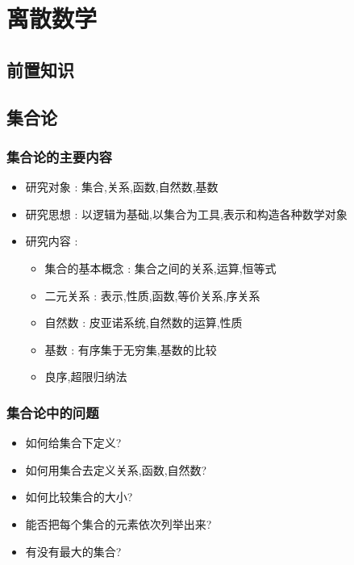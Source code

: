 \section{离散数学}{

\subsection{前置知识}

\subsection{集合论}{

\subsubsection{集合论的主要内容}{
  \begin{itemize}
    \item 研究对象 : 集合,关系,函数,自然数,基数
    \item 研究思想 : 以逻辑为基础,以集合为工具,表示和构造各种数学对象
    \item 研究内容 : \begin{itemize}
            \item 集合的基本概念 : 集合之间的关系,运算,恒等式
            \item 二元关系 : 表示,性质,函数,等价关系,序关系
            \item 自然数 : 皮亚诺系统,自然数的运算,性质
            \item 基数 : 有序集于无穷集,基数的比较
            \item 良序,超限归纳法
          \end{itemize}
  \end{itemize}
}%

\subsubsection{集合论中的问题}{
  \begin{itemize}
    \item 如何给集合下定义?
    \item 如何用集合去定义关系,函数,自然数?
    \item 如何比较集合的大小?
    \item 能否把每个集合的元素依次列举出来?
    \item 有没有最大的集合?
  \end{itemize}
}%

}}
